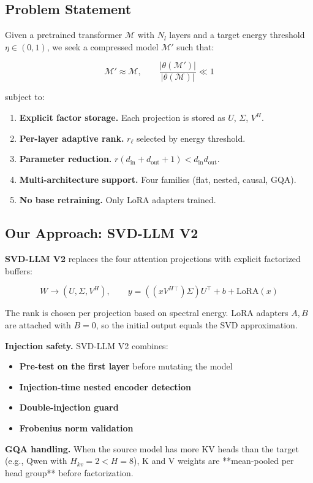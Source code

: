 \subsection{Problem Statement}

Given a pretrained transformer $\mathcal{M}$ with $N_l$ layers and a target 
energy threshold $\eta \in (0, 1)$, we seek a compressed model 
$\mathcal{M}'$ such that:

\[
\mathcal{M}' \approx \mathcal{M}, \qquad
\frac{|\theta(\mathcal{M}')|}{|\theta(\mathcal{M})|} \ll 1
\tag{1.2}
\]

subject to:

\begin{enumerate}
\item \textbf{Explicit factor storage.} Each projection is stored as $U$, $\Sigma$, $V^H$.
\item \textbf{Per-layer adaptive rank.} $r_\ell$ selected by energy threshold.
\item \textbf{Parameter reduction.} $r(d_\text{in} + d_\text{out} + 1) < d_\text{in} d_\text{out}$.
\item \textbf{Multi-architecture support.} Four families (flat, nested, causal, GQA).
\item \textbf{No base retraining.} Only LoRA adapters trained.

\end{enumerate}
\subsection{Our Approach: SVD-LLM V2}

\textbf{SVD-LLM V2} replaces the four attention projections with explicit 
factorized buffers:

\[
W \to (U, \Sigma, V^H), \qquad
y = ((x V^H{}^\top) \Sigma) U^\top + b + \text{LoRA}(x)
\tag{1.3}
\]

The rank is chosen per projection based on spectral energy. LoRA adapters 
$A, B$ are attached with $B = 0$, so the initial output equals the SVD 
approximation.

\textbf{Injection safety.} SVD-LLM V2 combines:
\begin{itemize}
\item \textbf{Pre-test on the first layer} before mutating the model
\item \textbf{Injection-time nested encoder detection}
\item \textbf{Double-injection guard}
\item \textbf{Frobenius norm validation}

\end{itemize}
\textbf{GQA handling.} When the source model has more KV heads than the target 
(e.g., Qwen with $H_{kv} = 2 < H = 8$), K and V weights are **mean-pooled 
per head group** before factorization.

